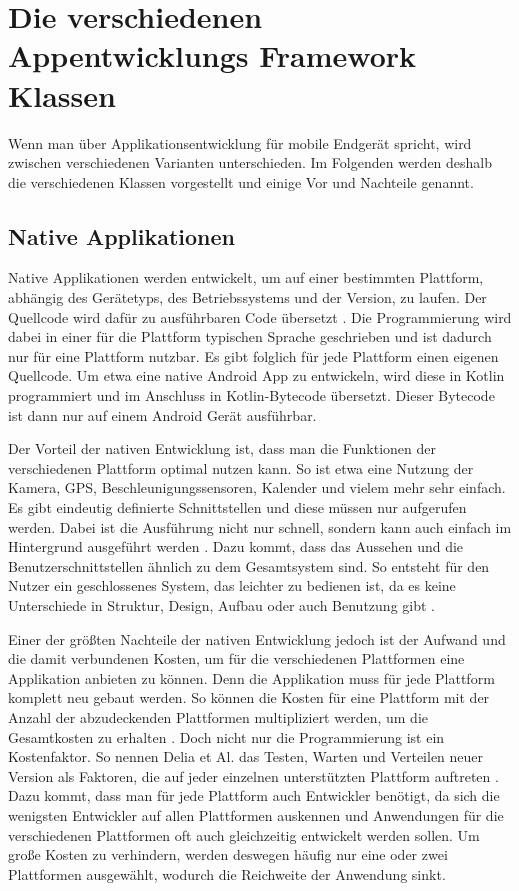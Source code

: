 \section{Die verschiedenen Appentwicklungs Framework Klassen}
Wenn man über Applikationsentwicklung für mobile Endgerät spricht, wird zwischen verschiedenen Varianten unterschieden. Im Folgenden werden deshalb die verschiedenen Klassen vorgestellt und einige Vor und Nachteile genannt.
\subsection{Native Applikationen}
Native Applikationen werden entwickelt, um auf einer bestimmten Plattform, abhängig des Gerätetyps, des Betriebssystems und der Version, zu laufen. Der Quellcode wird dafür zu ausführbaren Code übersetzt \cite{IEEE_development_classes}.
Die Programmierung wird dabei in einer für die Plattform typischen Sprache geschrieben und ist dadurch nur für eine Plattform nutzbar. Es gibt folglich für jede Plattform einen eigenen Quellcode. Um etwa eine native Android App zu entwickeln, wird diese in Kotlin programmiert und im Anschluss in Kotlin-Bytecode übersetzt. Dieser Bytecode ist dann nur auf einem Android Gerät ausführbar.

Der Vorteil der nativen Entwicklung ist, dass man die Funktionen der verschiedenen Plattform optimal nutzen kann. So ist etwa eine Nutzung der Kamera, GPS, Beschleunigungssensoren, Kalender und vielem mehr sehr einfach. Es gibt eindeutig definierte Schnittstellen und diese müssen nur aufgerufen werden. Dabei ist die Ausführung nicht nur schnell, sondern kann auch einfach im Hintergrund ausgeführt werden \cite{IEEE_development_classes}. Dazu kommt, dass das Aussehen und die Benutzerschnittstellen ähnlich zu dem Gesamtsystem sind. So entsteht für den Nutzer ein geschlossenes System, das leichter zu bedienen ist, da es keine Unterschiede in Struktur, Design, Aufbau oder auch Benutzung gibt \cite{IEEE_Khackouch_Al}.

Einer der größten Nachteile der nativen Entwicklung jedoch ist der Aufwand und die damit verbundenen Kosten, um für die verschiedenen Plattformen eine Applikation anbieten zu können. Denn die Applikation muss für jede Plattform komplett neu gebaut werden. So können die Kosten für eine Plattform mit der Anzahl der abzudeckenden Plattformen multipliziert werden, um die Gesamtkosten zu erhalten \cite{IEEE_Khackouch_Al}. Doch nicht nur die Programmierung ist ein Kostenfaktor. So nennen Delia et Al. das Testen, Warten und Verteilen neuer Version als Faktoren, die auf jeder einzelnen unterstützten Plattform auftreten \cite{IEEE_development_classes}. Dazu kommt, dass man für jede Plattform auch Entwickler benötigt, da sich die wenigsten Entwickler auf allen Plattformen auskennen und Anwendungen für die verschiedenen Plattformen oft auch gleichzeitig entwickelt werden sollen. Um große Kosten zu verhindern, werden deswegen häufig nur  eine oder zwei Plattformen ausgewählt, wodurch die Reichweite der Anwendung sinkt.


